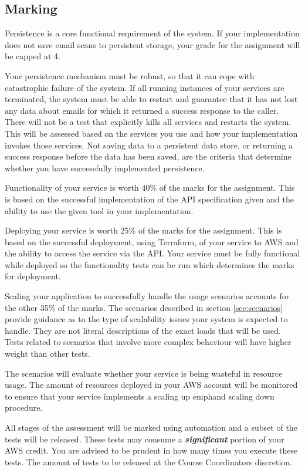 \documentclass{csse4400}
\begin{document}
\subsection{Marking}
Persistence is a core functional requirement of the system. If your implementation does not save email scans to persistent storage, your grade for the assignment will be capped at 4.

Your persistence mechanism must be robust, so that it can cope with catastrophic failure of the system. If all running instances of your services are terminated, the system must be able to restart and guarantee that it has not lost any data about emails for which it returned a success response to the caller. There will not be a test that explicitly kills all services and restarts the system. This will be assessed based on the services you use and how your implementation invokes those services. Not saving data to a persistent data store, or returning a success response before the data has been saved, are the criteria that determine whether you have successfully implemented persistence.

Functionality of your service is worth 40\% of the marks for the assignment. This is based on the successful implementation of the API specification given and the ability to use the given tool in your implementation.

Deploying your service is worth 25\% of the marks for the assignment. This is based on the successful deployment, using Terraform, of your service to AWS and the ability to access the service via the API. Your service must be fully functional while deployed so the functionality tests can be run which determines the marks for deployment.

Scaling your application to successfully handle the usage scenarios accounts for the other 35\% of the marks. The scenarios described in section \ref{sec:scenarios} provide guidance as to the type of scalability issues your system is expected to handle. They are not literal descriptions of the exact loads that will be used. Tests related to scenarios that involve more complex behaviour will have higher weight than other tests.

The scenarios will evaluate whether your service is being wasteful in resource usage. The amount of resources deployed in your AWS account will be monitored to ensure that your service implements a scaling up emph{and} scaling down procedure.

All stages of the assessment will be marked using automation and a subset of the tests will be released. These tests may consume a \textbf{\emph{significant}} portion of your AWS credit. You are advised to be prudent in how many times you execute these tests. The amount of tests to be released at the Course Coordinators discretion.
\end{document}
